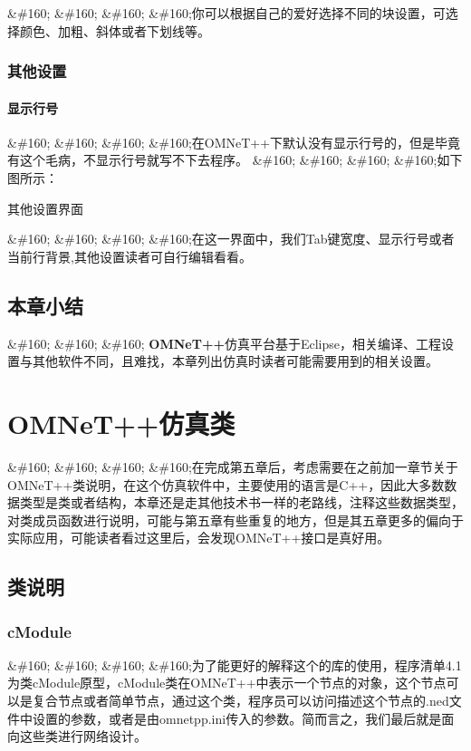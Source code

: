 \&\#160; \&\#160; \&\#160; \&\#160;你可以根据自己的爱好选择不同的块设置，可选择颜色、加粗、斜体或者下划线等。

\subsection{其他设置}
\label{其他设置}

\subsubsection{显示行号}
\label{显示行号}

\&\#160; \&\#160; \&\#160; \&\#160;在OMNeT++下默认没有显示行号的，但是毕竟有这个毛病，不显示行号就写不下去程序。
\&\#160; \&\#160; \&\#160; \&\#160;如下图所示：

其他设置界面


\&\#160; \&\#160; \&\#160; \&\#160;在这一界面中，我们Tab键宽度、显示行号或者当前行背景,其他设置读者可自行编辑看看。

\section{本章小结}
\label{本章小结}

\&\#160; \&\#160; \&\#160; \textbf{OMNeT++}仿真平台基于Eclipse，相关编译、工程设置与其他软件不同，且难找，本章列出仿真时读者可能需要用到的相关设置。

\chapter{OMNeT++仿真类}
\label{omnet仿真类}

\&\#160; \&\#160; \&\#160; \&\#160;在完成第五章后，考虑需要在之前加一章节关于OMNeT++类说明，在这个仿真软件中，主要使用的语言是C++，因此大多数数据类型是类或者结构，本章还是走其他技术书一样的老路线，注释这些数据类型，对类成员函数进行说明，可能与第五章有些重复的地方，但是其五章更多的偏向于实际应用，可能读者看过这里后，会发现OMNeT++接口是真好用。

\section{类说明}
\label{类说明}

\subsection{cModule　}
\label{cmodule　}

\&\#160; \&\#160; \&\#160; \&\#160;为了能更好的解释这个的库的使用，程序清单4.1为类cModule原型，cModule类在OMNeT++中表示一个节点的对象，这个节点可以是复合节点或者简单节点，通过这个类，程序员可以访问描述这个节点的.ned文件中设置的参数，或者是由omnetpp.ini传入的参数。简而言之，我们最后就是面向这些类进行网络设计。

